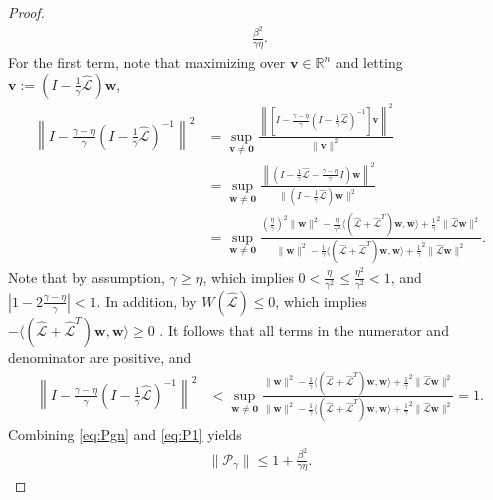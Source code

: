 \documentclass[a4paper,10pt]{article}
\begin{document}
{\begin{proof}
\begin{align}
		\frac{\beta^2}{\gamma\eta}. \label{eq:Pgn}
\end{align}
%
For the first term, note that maximizing over $\mathbf{v}\in\mathbb{R}^n$ and
letting $\mathbf{v} := (I - \tfrac{1}{\gamma}\widehat{\mathcal{L}})\mathbf{w}$,
%
\begin{align*}
\left\| I - \tfrac{\gamma-\eta}
	{\gamma}(I - \tfrac{1}{\gamma}\widehat{\mathcal{L}})^{-1}\right\|^2
		& = \sup_{\mathbf{v}\neq\mathbf{0}} \frac{\left\| [I - \frac{\gamma-\eta}
	{\gamma}(I - \tfrac{1}{\gamma}\widehat{\mathcal{L}})^{-1}]\mathbf{v}\right\|^2}{\|\mathbf{v}\|^2}  \\
& = \sup_{\mathbf{w}\neq\mathbf{0}} \frac{\left\| (I - \tfrac{1}{\gamma}\widehat{\mathcal{L}} -
		\frac{\gamma-\eta}{\gamma}I )\mathbf{w}\right\|^2}{\|(I - \tfrac{1}{\gamma}\widehat{\mathcal{L}})
		\mathbf{w}\|^2} \\
& = \sup_{\mathbf{w}\neq\mathbf{0}} \frac{(\tfrac{\eta}{\gamma})^2\|\mathbf{w}\|^2
	- \tfrac{\eta}{\gamma^2}\langle (\widehat{\mathcal{L}} + \widehat{\mathcal{L}}^T)
		\mathbf{w},\mathbf{w}\rangle + \tfrac{1}{\gamma}^2\|\widehat{\mathcal{L}}\mathbf{w}\|^2}
	{\|\mathbf{w}\|^2 - \tfrac{1}{\gamma}\langle (\widehat{\mathcal{L}} + \widehat{\mathcal{L}}^T)
		\mathbf{w},\mathbf{w}\rangle + \tfrac{1}{\gamma}^2\|\widehat{\mathcal{L}}\mathbf{w}\|^2}.
\end{align*}
%
Note that by assumption, $\gamma \geq \eta$, which implies
$0< \tfrac{\eta}{\gamma^2} \leq \tfrac{\eta^2}{\gamma^2}  < 1$, and 
$|1 - 2\tfrac{\gamma-\eta}{\gamma}| < 1$. In addition, by  $W(\widehat{\mathcal{L}})\leq 0$,
which implies $-\langle (\widehat{\mathcal{L}}+\widehat{\mathcal{L}}^T)\mathbf{w},\mathbf{w}\rangle \geq 0$
\cite{gustafson1997numerical,mees1979domains}.
It follows that all terms in the numerator and denominator are positive, and
%
\begin{align} \label{eq:P1}
\left\| I - \tfrac{\gamma-\eta}
	{\gamma}(I - \tfrac{1}{\gamma}\widehat{\mathcal{L}})^{-1}\right\|^2
& < \sup_{\mathbf{w}\neq\mathbf{0}} \frac{\|\mathbf{w}\|^2
	- \tfrac{1}{\gamma}\langle (\widehat{\mathcal{L}} + \widehat{\mathcal{L}}^T)
		\mathbf{w},\mathbf{w}\rangle + \tfrac{1}{\gamma}^2\|\widehat{\mathcal{L}}\mathbf{w}\|^2}
	{\|\mathbf{w}\|^2 - \tfrac{1}{\gamma}\langle (\widehat{\mathcal{L}} + \widehat{\mathcal{L}}^T)
		\mathbf{w},\mathbf{w}\rangle + \tfrac{1}{\gamma}^2\|\widehat{\mathcal{L}}\mathbf{w}\|^2} 
= 1.
\end{align}
%
Combining \eqref{eq:Pgn} and \eqref{eq:P1} yields
%
\begin{align}\label{eq:Pgamma_gen}
\|\mathcal{P}_\gamma\| \leq 1 + \frac{\beta^2}{\gamma\eta}.
\end{align}


\end{proof}}
\end{document}
